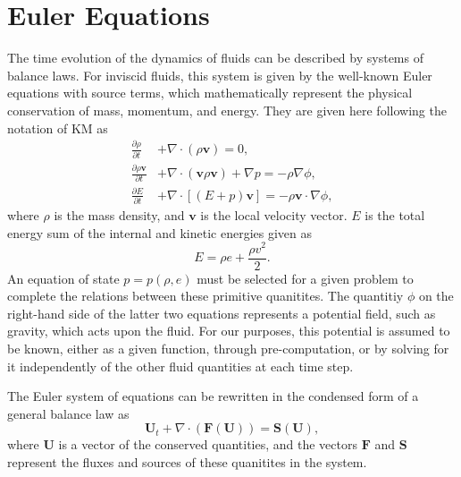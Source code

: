 \section{Euler Equations}
\label{sec:euler}

The time evolution of the dynamics of fluids can be described by systems of balance laws. For inviscid fluids, this system is given by the well-known Euler equations with source terms, which mathematically represent the physical conservation of mass, momentum, and energy. They are given here following the notation of KM as
\begin{subequations} \label{eq:eulerFull}
\begin{align}
\frac{\partial{\rho}}{\partial{t}} &+ \nabla \cdot (\rho \mathbf{v}) = 0, \label{eq:eulerContinuity} \\
\frac{\partial{\rho \mathbf{v}}}{\partial{t}} &+ \nabla \cdot (\mathbf{v} \rho \mathbf{v}) + \nabla p = -\rho \nabla \phi, \label{eq:eulerMomentum} \\
\frac{\partial{E}}{\partial{t}} &+ \nabla \cdot \left[(E+p)\mathbf{v}\right] = -\rho \mathbf{v} \cdot \nabla \phi,  \label{eq:eulerEnergy} 
\end{align}
\end{subequations}
where $\rho$ is the mass density, and $\mathbf{v}$ is the local velocity vector. $E$ is the total energy sum of the internal and kinetic energies given as
\begin{equation} \label{eq:totalEnergy}
E=\rho e + \frac{\rho v^2}{2}.
\end{equation}
An equation of state $p=p(\rho,e)$ must be selected for a given problem to complete the relations between these primitive quanitites. The quantitiy $\phi$ on the right-hand side of the latter two equations represents a potential field, such as gravity, which acts upon the fluid. For our purposes, this potential is assumed to be known, either as a given function, through pre-computation, or by solving for it independently of the other fluid quantities at each time step.

The Euler system of equations can be rewritten in the condensed form of a general balance law as
\begin{equation} \label{eq:euler}
\mathbf{U}_t+\nabla\cdot(\mathbf{F}(\mathbf{U}))=\mathbf{S}(\mathbf{U}),
\end{equation}
where $\mathbf{U}$ is a vector of the conserved quantities, and the vectors $\mathbf{F}$ and $\mathbf{S}$ represent the fluxes and sources of these quanitites in the system.


